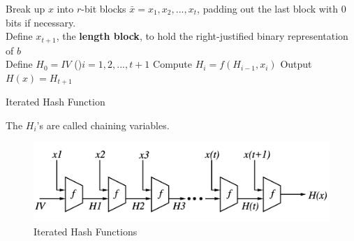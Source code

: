 \documentclass[12pt,titlepage]{article}
\begin{document}
\begin{algorithm}
	Break up $x$ into $r$-bit blocks $\bar{x} = x_1, x_2, ..., x_t$, padding out the last block with 0 bits if necessary.\\
	Define $x_{t+1}$, the \textbf{length block}, to hold the right-justified binary representation of $b$\\
	Define $H_0 = IV$
	\For(){$i=1,2,...,t+1$}{
		Compute $H_i = f(H_{i-1}, x_i)$
	}
	Output $H(x) = H_{t+1}$
	\caption{Iterated Hash Function}
\end{algorithm}

The $H_i$'s are called chaining variables. 

\begin{center}
	\begin{figure}[h!]
		\includegraphics[width=\textwidth]{Iterated_Hash_Functions.png}
		\caption{Iterated Hash Functions}
	\end{figure}
\end{center}
\end{document}
